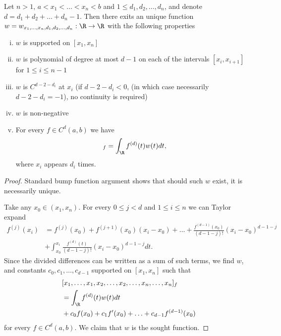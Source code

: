 \begin{lause}
	Let $n > 1$, $a < x_{1} < \ldots < x_{n} < b$ and $1 \leq d_{1}, d_{2}, \ldots, d_{n}$, and denote $d = d_{1} + d_{2} + \ldots + d_{n} - 1$. Then there exits an unique function $w = w_{x_{1}, \ldots, x_{n}, d_{1}, d_{2}, \ldots, d_{n}} : \R \to \R$ with the following properties
	\begin{enumerate}[(i)]
		\item $w$ is supported on $[x_{1}, x_{n}]$
		\item $w$ is polynomial of degree at most $d - 1$ on each of the intervals $[x_{i}, x_{i + 1}]$ for $1 \leq i \leq n - 1$
		\item $w$ is $C^{d - 2 - d_{i}}$ at $x_{i}$ (if $d - 2 - d_{i} < 0$, (in which case necessarily $d - 2 - d_{i} = -1$), no continuity is required)
		\item $w$ is non-negative
		\item For every $f \in C^{d}(a, b)$ we have
		\begin{align*}
			[x_{1}, \ldots, x_{1}, x_{2}, \ldots, x_{2}, \ldots, x_{n}, \ldots, x_{n}]_{f} = \int_{\R} f^{(d)}(t) w(t) dt,
		\end{align*}
		where $x_{i}$ appears $d_{i}$ times.
	\end{enumerate}
	\begin{proof}
		Standard bump function argument shows that should such $w$ exist, it is necessarily unique.

		Take any $x_{0} \in (x_{1}, x_{n})$. For every $0 \leq j < d$ and $1 \leq i \leq n$ we can Taylor expand
		\begin{align*}
			f^{(j)}(x_{i}) &= f^{(j)}(x_{0}) + f^{(j + 1)}(x_{0})(x_{i} - x_{0}) + \ldots + \frac{f^{(d - 1)}(x_{0})}{(d - 1 - j)!} (x_{i} - x_{0})^{d - 1 - j} \\
			&+ \int_{x_{0}}^{x_{i}} \frac{f^{(d)}(t)}{(d - 1 - j)!} (x_{i} - x_{0})^{d - 1 - j} dt.
		\end{align*}
		Since the divided differences can be written as a sum of such terms, we find $w$, and constants $c_{0}, c_{1}, \ldots, c_{d - 1}$ supported on $[x_{1}, x_{n}]$ such that
		\begin{align*}
			& [x_{1}, \ldots, x_{1}, x_{2}, \ldots, x_{2}, \ldots, x_{n}, \ldots, x_{n}]_{f} \\
			&= \int_{\R} f^{(d)}(t) w(t) dt \\
			&+  c_{0} f(x_{0}) + c_{1} f'(x_{0}) + \ldots + c_{d - 1} f^{(d - 1)}(x_{0})
		\end{align*}
		for every $f \in C^{d}(a, b)$. We claim that $w$ is the sought function.


\end{proof}
\end{lause}
